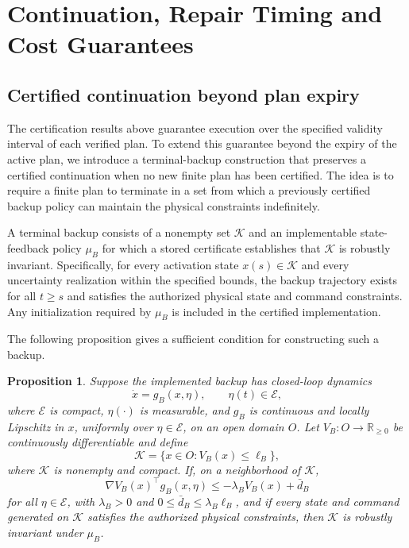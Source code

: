 \documentclass[journal,10pt]{IEEEtran}
\newtheorem{proposition}{Proposition}
\begin{document}
\section{Continuation, Repair Timing and Cost Guarantees}
\label{app:repair-cost}

\subsection{Certified continuation beyond plan expiry}
\label{sec:terminal-backup}

The certification results above guarantee execution over the specified validity
interval of each verified plan. To extend this guarantee beyond the expiry of
the active plan, we introduce a terminal-backup construction that preserves a
certified continuation when no new finite plan has been certified. The idea is
to require a finite plan to terminate in a set from which a previously
certified backup policy can maintain the physical constraints indefinitely.

A terminal backup consists of a nonempty set $\mathcal K$ and an implementable
state-feedback policy $\mu_B$ for which a stored certificate establishes that
$\mathcal K$ is robustly invariant. Specifically, for every activation state
$x(s)\in\mathcal K$ and every uncertainty realization within the specified
bounds, the backup trajectory exists for all $t\ge s$ and satisfies the
authorized physical state and command constraints. Any initialization required by $\mu_B$ is included in the certified
implementation.

The following proposition gives a sufficient condition for constructing such
a backup.

\begin{proposition}
\label{prop:backup-lyapunov}
Suppose the implemented backup has closed-loop dynamics
\[
\dot x=g_B(x,\eta),\qquad \eta(t)\in\mathcal E,
\]
where $\mathcal E$ is compact, $\eta(\cdot)$ is measurable, and $g_B$ is
continuous and locally Lipschitz in $x$, uniformly over
$\eta\in\mathcal E$, on an open domain $O$. Let
$V_B:O\rightarrow\mathbb R_{\ge0}$ be continuously differentiable and define
\[
\mathcal K=\{x\in O:V_B(x)\le\ell_B\},
\]
where $\mathcal K$ is nonempty and compact. If, on a neighborhood of
$\mathcal K$,
\[
\nabla V_B(x)^\top g_B(x,\eta)
\le -\lambda_B V_B(x)+\bar d_B
\]
for all $\eta\in\mathcal E$, with
$\lambda_B>0$ and
$0\le\bar d_B\le\lambda_B\ell_B$, and if every state and command generated
on $\mathcal K$ satisfies the authorized physical constraints, then
$\mathcal K$ is robustly invariant under $\mu_B$.
\end{proposition}
\end{document}
